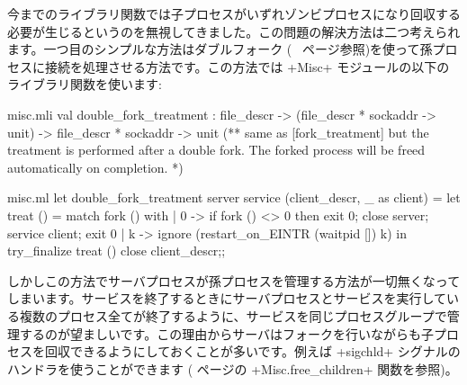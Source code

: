 今までのライブラリ関数では子プロセスがいずれゾンビプロセスになり回収する必要が生じるというのを無視してきました。この問題の解決方法は二つ考えられます。一つ目のシンプルな方法はダブルフォーク (~\pageref{double-fork} ページ参照)を使って孫プロセスに接続を処理させる方法です。この方法では \ml+Misc+ モジュールの以下のライブラリ関数を使います:
%
\begin{codefile}{misc.mli}
val double_fork_treatment :
file_descr -> (file_descr * sockaddr -> unit) ->
file_descr * sockaddr -> unit
(** same as [fork_treatment] but the treatment is performed after a double
   fork. The forked process will be freed automatically on
   completion. *)
\end{codefile}
%
\begin{listingcodefile}{misc.ml}
let double_fork_treatment server service (client_descr, _ as client) =
  let treat () = match fork () with
    | 0 ->
        if fork () <> 0 then exit 0;
        close server; service client; exit 0
    | k ->
        ignore (restart_on_EINTR (waitpid []) k)
  in
  try_finalize treat () close client_descr;;
\end{listingcodefile}
%
しかしこの方法でサーバプロセスが孫プロセスを管理する方法が一切無くなってしまいます。サービスを終了するときにサーバプロセスとサービスを実行している複数のプロセス全てが終了するように、サービスを同じプロセスグループで管理するのが望ましいです。この理由からサーバはフォークを行いながらも子プロセスを回収できるようにしておくことが多いです。例えば \ml+sigchld+ シグナルのハンドラを使うことができます (\pageref{ex/childs} ページの \ml+Misc.free_children+ 関数を参照)。

